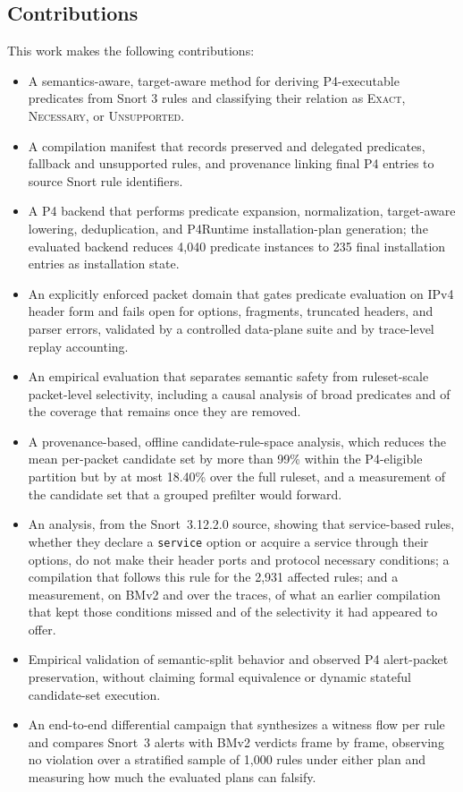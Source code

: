 \documentclass{article}
\begin{document}
\subsection{Contributions}
This work makes the following contributions:
\begin{itemize}
    \item A semantics-aware, target-aware method for deriving P4-executable
    predicates from Snort 3 rules and classifying their relation as
    \textsc{Exact}, \textsc{Necessary}, or \textsc{Unsupported}.
    \item A compilation manifest that records preserved and delegated
    predicates, fallback and unsupported rules, and provenance linking final
    P4 entries to source Snort rule identifiers.
    \item A P4 backend that performs predicate expansion, normalization,
    target-aware lowering, deduplication, and P4Runtime installation-plan
    generation; the evaluated backend reduces 4,040 predicate instances to
    235 final installation entries as installation state.
    \item An explicitly enforced packet domain that gates predicate
    evaluation on IPv4 header form and fails open for options, fragments,
    truncated headers, and parser errors, validated by a controlled
    data-plane suite and by trace-level replay accounting.
    \item An empirical evaluation that separates semantic safety from
    ruleset-scale packet-level selectivity, including a causal analysis of
    broad predicates and of the coverage that remains once they are removed.
    \item A provenance-based, offline candidate-rule-space analysis, which
    reduces the mean per-packet candidate set by more than 99\% within the
    P4-eligible partition but by at most 18.40\% over the full ruleset, and a
    measurement of the candidate set that a grouped prefilter would forward.
    \item An analysis, from the Snort~3.12.2.0 source, showing that
    service-based rules, whether they declare a \texttt{service} option or
    acquire a service through their options, do not make their header ports
    and protocol necessary conditions; a compilation that follows this rule
    for the 2,931 affected rules; and a measurement, on BMv2 and over the
    traces, of what an earlier compilation that kept those conditions missed
    and of the selectivity it had appeared to offer.
    \item Empirical validation of semantic-split behavior and observed P4
    alert-packet preservation, without claiming formal equivalence or dynamic
    stateful candidate-set execution.
    \item An end-to-end differential campaign that synthesizes a witness flow
    per rule and compares Snort~3 alerts with BMv2 verdicts frame by frame,
    observing no violation over a stratified sample of 1,000 rules under
    either plan and measuring how much the evaluated plans can falsify.
\end{itemize}
\end{document}
